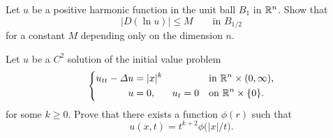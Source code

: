 \begin{problem}
  Let \(u\) be a positive harmonic function in the unit ball \(B_1\) in
  \(\mathbb{R}^n\). Show that
  \[
    \bigl|D(\ln u)\bigr|\leq M\qquad \text{in \(B_{1/2}\)}
  \]
  for a constant \(M\) depending only on the dimension \(n\).

\end{problem}
\begin{solution*}
\end{solution*}

\begin{problem}
  Let \(u\) be a \(C^2\) solution of the initial value problem
  \[
    \left\{
    \begin{aligned}
      u_{tt}-\Lap u&=|x|^k&&&&\text{in \(\R^n\times(0,\infty)\),}\\
      u&=0,&u_t&=0&&\text{on \(\R^n\times\{0\}\)}.
    \end{aligned}
    \right.
  \]
  for some \(k\geq 0\). Prove that there exists a function \(\phi(r)\)
  such that
  \[
    u(x,t)=t^{k+2}\phi\bigl(|x|/t\bigr).
  \]

  \noindent [\emph{Hint:} As one of the steps show that \(u\) is
  \((k+2)\)-homogeneous in \((x,t)\) variables, i.e.,
  \(u(\lambda x,\lambda t)=\lambda^{k+2}u(x,t)\) for any \(\lambda >0\).]
\end{problem}
\begin{solution*}
\end{solution*}

